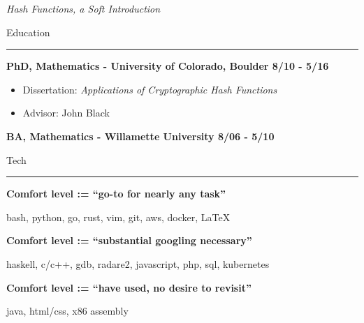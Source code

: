 \documentclass{letter}
\begin{document}
\textit{Hash Functions, a Soft Introduction}

\vspc

\large{Education}
\vskip1mm
\hrule

\textbf{PhD, Mathematics - University of Colorado, Boulder \hfill 8/10 - 5/16}
\begin{itemize}
    \setlength\itemsep{-0.5em}
    \item Dissertation: \textit{Applications of Cryptographic Hash Functions}
    \item Advisor: John Black
\end{itemize}

\textbf{BA, Mathematics - Willamette University \hfill 8/06 - 5/10}

\vspc

\large{Tech}
\vskip1mm
\hrule

\textbf{Comfort level := ``go-to for nearly any task''}

bash, python, go, rust, vim, git, aws, docker, \LaTeX

\vspc

\textbf{Comfort level := ``substantial googling necessary''}

haskell, c/c++, gdb, radare2, javascript, php, sql, kubernetes

\vspc

\textbf{Comfort level := ``have used, no desire to revisit''}

java, html/css, x86 assembly
\end{document}
